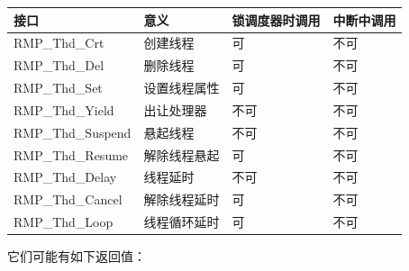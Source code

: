{\def\LTcaptype{none} %
\begin{longtable}[]{@{}
  >{\raggedright\arraybackslash}p{}
  >{\raggedright\arraybackslash}p{}
  >{\raggedright\arraybackslash}p{}
  >{\raggedright\arraybackslash}p{}@{}}
\toprule\noalign{}
\begin{minipage}[b]{\linewidth}\raggedright
接口
\end{minipage} & \begin{minipage}[b]{\linewidth}\raggedright
意义
\end{minipage} & \begin{minipage}[b]{\linewidth}\raggedright
锁调度器时调用
\end{minipage} & \begin{minipage}[b]{\linewidth}\raggedright
中断中调用
\end{minipage} \\
\midrule\noalign{}
\endhead
\bottomrule\noalign{}
\endlastfoot
RMP\_Thd\_Crt & 创建线程 & 可 & 不可 \\
RMP\_Thd\_Del & 删除线程 & 可 & 不可 \\
RMP\_Thd\_Set & 设置线程属性 & 可 & 不可 \\
RMP\_Thd\_Yield & 出让处理器 &
不可\footnotemark{} & 不可 \\
RMP\_Thd\_Suspend & 悬起线程 & 不可 & 不可 \\
RMP\_Thd\_Resume & 解除线程悬起 & 可 & 不可 \\
RMP\_Thd\_Delay & 线程延时 & 不可 & 不可 \\
RMP\_Thd\_Cancel & 解除线程延时 & 可 & 不可 \\
RMP\_Thd\_Loop & 线程循环延时 & 可 & 不可 \\
\end{longtable}
}

它们可能有如下返回值：

\label{tab:possible-return-values-of-the-thread-scheduling-interface}

